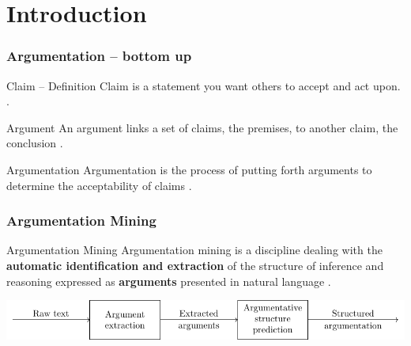 \documentclass{beamer}
\begin{document}
\section{Introduction}


\begin{frame}
	\frametitle{Argumentation -- bottom up}

\begin{block}{Claim -- Definition}
Claim is a statement you want others to accept and act upon.
\cite{rieke1997argumentation}. 
\end{block}

\begin{block}{Argument}
An argument links a set of claims, the premises, to another claim, the conclusion
\cite{walton1989informal}.
\end{block}

\begin{block}{Argumentation}
Argumentation is the process of putting forth arguments to determine  the
acceptability of claims \cite{walton1989informal}.
\end{block}

\end{frame}


\begin{frame}

\frametitle{Argumentation Mining}
\begin{block}{Argumentation Mining}
Argumentation mining is a discipline dealing with the \textbf{automatic identification and extraction}
of the structure of inference and reasoning expressed as \textbf{arguments} presented in natural language
\cite{lawrence2019argument}.
\end{block}

\vspace{1cm}
\includegraphics[scale=0.7]{../area_description_pipeline-figure0.pdf}
\end{frame}
\end{document}
